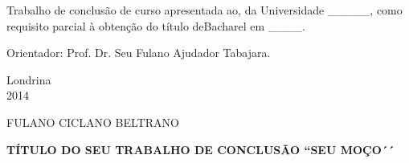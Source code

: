 \vspace{1.0cm}
\begin{singlespace}
\noindent
\begin{flushright}
\begin{minipage}[t]{9cm}

Trabalho de conclusão de curso apresentada ao, da Universidade \_\_\_\_\_, como requisito parcial à obtenção do título de\linebreak Bacharel em \_\_\_\_.

\vspace{0.5 cm}

Orientador: Prof\degree. Dr. Seu Fulano Ajudador Tabajara.

\end{minipage}
\end{flushright}
\end{singlespace}

\vspace{5.8cm}

\begin{singlespace}
\begin{center}
Londrina\\
2014
\end{center}
\end{singlespace}


\newpage







\thispagestyle{empty}

\setcounter{page}{2}
\begin{center}
{\large  FULANO CICLANO BELTRANO}
\vspace{2.0cm}

\textbf{\large TÍTULO DO SEU TRABALHO DE CONCLUSÃO ``SEU MOÇO´´}

\end{center}

